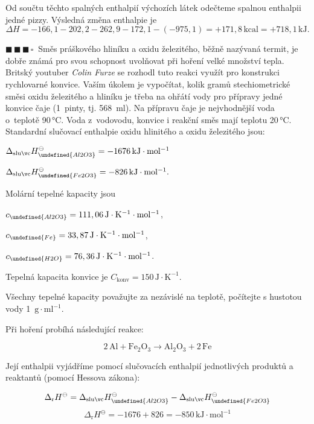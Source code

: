 \documentclass{book}
\let\ch\undefined
\newcommand{\tri}{$\blacksquare \, \blacksquare \, \blacksquare \, \square \; \; $}
\renewenvironment{quotation}{\par}{\par} %
\begin{document}
Od součtu těchto spalných enthalpií výchozích látek odečteme spalnou enthalpii jedné
pizzy. Výsledná změna enthalpie je 
\[
\Delta H = -166,1-202,2-262,9-172,1-(-975,1)=+171,8\, \mathrm{kcal}=+718,1\, \mathrm{kJ}.
\]

\hrulefill %
\begin{quotation}
\tri Směs práškového hliníku a oxidu železitého, běžně nazývaná termit,
je dobře známá pro svou schopnost uvolňovat při hoření velké množství
tepla. Britský youtuber \textit{Colin Furze} se rozhodl tuto reakci
využít pro konstrukci rychlovarné konvice. Vaším úkolem je vypočítat,
kolik gramů stechiometrické směsi oxidu železitého a hliníku je třeba
na ohřátí vody pro přípravy jedné konvice čaje (1~pinty, tj. 568~ml).
Na přípravu čaje je nejvhodnější voda o~teplotě 90\,°C. Voda z~vodovodu,
konvice i reakční směs mají teplotu 20\,°C. Standardní slučovací enthalpie
oxidu hlinitého a oxidu železitého jsou:

$\Delta_{\mathrm{sluč}}H_{\ch{Al2O3}}^{\ominus}=-1676\,\mathrm{kJ\cdot mol^{-1}}$

$\Delta_{\mathrm{sluč}}H_{\ch{Fe2O3}}^{\ominus}=-826\,\mathrm{kJ\cdot mol^{-1}}.$

Molární tepelné kapacity jsou 

$c_{\ch{Al2O3}}=111,06\,\mathrm{J\cdot K^{-1}\cdot mol^{-1}}$, 

$c_{\ch{Fe}}=33,87\,\mathrm{J\cdot K^{-1}\cdot mol^{-1}}$, 

$c_{\ch{H2O}}=76,36\,\mathrm{J\cdot K^{-1}\cdot mol^{-1}}$. 

Tepelná kapacita konvice je $C_{\mathrm{konv}}=150\,\mathrm{J\cdot K^{-1}}$. 

Všechny tepelné kapacity považujte za nezávislé na teplotě, počítejte
s hustotou vody 1~$\mathrm{g\cdot ml^{-1}}$. 
\end{quotation} \dotfill \par 
Při hoření probíhá následující reakce:

\[
\mathrm{2\,Al+Fe_{2}O_{3}\rightarrow Al_{2}O_{3}+2\,Fe}
\]

Její enthalpii vyjádříme pomocí slučovacích enthalpií jednotlivých
produktů a reaktantů (pomocí Hessova zákona):

\[
\Delta_{\mathrm{r}}H^{\ominus}=\Delta_{\mathrm{sluč}}H_{\ch{Al2O3}}^{\ominus}-\Delta_{\mathrm{sluč}}H_{\ch{Fe2O3}}^{\ominus}
\]
\[
\Delta_{\mathrm{r}}H^{\ominus}=-1676+826=-850\,\mathrm{kJ\cdot mol^{-1}}
\]
\end{document}
